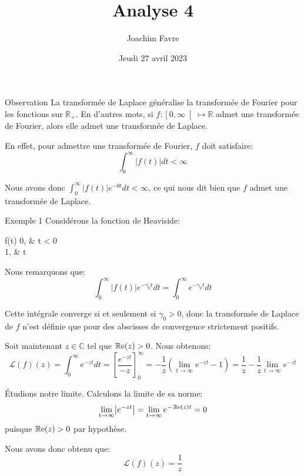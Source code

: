 \documentclass[a4paper]{article}
\title{Analyse 4}
\author{Joachim Favre}
\date{Jeudi 27 avril 2023}
\begin{document}
\maketitle


\begin{parag}{Observation}
    La transformée de Laplace généralise la transformée de Fourier pour les fonctions sur $\mathbb{R}_+$. En d'autres mots, si $f: \left[0, \infty\right[ \mapsto \mathbb{R}$ admet une transformée de Fourier, alors elle admet une transformée de Laplace.

    En effet, pour admettre une transformée de Fourier, $f$ doit satisfaire: 
    \[\int_{0}^{\infty} \left|f\left(t\right)\right| dt < \infty\]
        
    Nous avons donc $\int_{0}^{\infty} \left|f\left(t\right)\right|e^{-0 t} dt < \infty$, ce qui nous dit bien que $f$ admet une transformée de Laplace.
\end{parag}

\begin{parag}{Exemple 1}
    Considérons la fonction de Heaviside: 
    \begin{functionbypart}{f\left(t\right)} 
    0, &  t < 0 \\
    1, &  t 
    \end{functionbypart}
    
    Nous remarquons que: 
    \[\int_{0}^{\infty} \left|f\left(t\right)\right| e^{- \gamma_0 t} dt = \int_{0}^{\infty} e^{- \gamma_0 t} dt\]

    Cette intégrale converge si et seulement si $\gamma_0 > 0$, donc la transformée de Laplace de $f$ n'est définie que pour des abscisses de convergence strictement positifs.

    Soit maintenant $z \in \mathbb{C}$ tel que $\cre\left(z\right) > 0$. Nous obtenons: 
    \[\mathcal{L}\left(f\right)\left(z\right) = \int_{0}^{\infty} e^{-zt}dt = \left[\frac{e^{-zt}}{-z}\right]_{0}^{\infty} = -\frac{1}{z}\left(\lim_{t \to \infty} e^{-zt} - 1\right) = \frac{1}{z} - \frac{1}{z} \lim_{t \to \infty} e^{-zt}\]
    
    Étudions notre limite. Calculons la limite de sa norme: 
    \[\lim_{t \to \infty} \left|e^{-zt}\right| = \lim_{t \to \infty} e^{-\cre\left(z\right)t} = 0\]
    puisque $\cre\left(z\right) > 0$ par hypothèse.

    Nous avons donc obtenu que: 
    \[\mathcal{L}\left(f\right)\left(z\right) = \frac{1}{z}\]
\end{parag}
\end{document}
